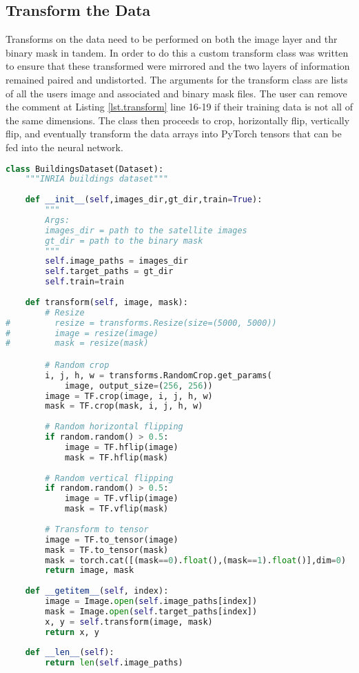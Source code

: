 \subsection{Transform the Data}
Transforms on the data need to be performed on both the image layer and thr binary mask in tandem. In order to do this a custom transform class was written to ensure that these transformed were mirrored and the two layers of information remained paired and undistorted.
The arguments for the transform class are lists of all the users image and associated and binary mask files. The user can remove the comment at Listing \ref{lst.transform} line 16-19 if their training data is not all of the same dimensions. The class then proceeds to crop, horizontally flip, vertically flip, and eventually transform the data arrays into PyTorch tensors that can be fed into the neural network. \par 
 \begin{lstlisting}[language=Python, caption = Transform Class, label={lst.transform}]
class BuildingsDataset(Dataset):
    """INRIA buildings dataset"""
    
    def __init__(self,images_dir,gt_dir,train=True):
        """
        Args:
        images_dir = path to the satellite images
        gt_dir = path to the binary mask
        """
        self.image_paths = images_dir
        self.target_paths = gt_dir
        self.train=train
        
    def transform(self, image, mask):
        # Resize
#         resize = transforms.Resize(size=(5000, 5000))
#         image = resize(image)
#         mask = resize(mask)

        # Random crop
        i, j, h, w = transforms.RandomCrop.get_params(
            image, output_size=(256, 256))
        image = TF.crop(image, i, j, h, w)
        mask = TF.crop(mask, i, j, h, w)
        
        # Random horizontal flipping
        if random.random() > 0.5:
            image = TF.hflip(image)
            mask = TF.hflip(mask)
            
        # Random vertical flipping
        if random.random() > 0.5:
            image = TF.vflip(image)
            mask = TF.vflip(mask)
            
        # Transform to tensor
        image = TF.to_tensor(image)
        mask = TF.to_tensor(mask)
        mask = torch.cat([(mask==0).float(),(mask==1).float()],dim=0)
        return image, mask
        
    def __getitem__(self, index):
        image = Image.open(self.image_paths[index])
        mask = Image.open(self.target_paths[index])
        x, y = self.transform(image, mask)
        return x, y
        
    def __len__(self):
        return len(self.image_paths)
\end{lstlisting}
